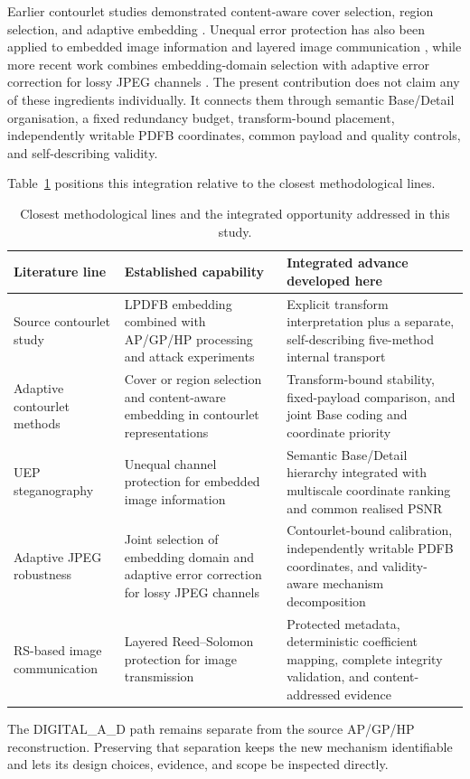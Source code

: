 Earlier contourlet studies demonstrated content-aware cover selection, region selection, and adaptive embedding \citep{SajediJamzad2010,Fakhredanesh2013}. Unequal error protection has also been applied to embedded image information and layered image communication \citep{MaoQin2013,AlmawganiSalleh2011}, while more recent work combines embedding-domain selection with adaptive error correction for lossy JPEG channels \citep{Duan2023}. The present contribution does not claim any of these ingredients individually. It connects them through semantic Base/Detail organisation, a fixed redundancy budget, transform-bound placement, independently writable PDFB coordinates, common payload and quality controls, and self-describing validity.

Table~\ref{tab:novelty} positions this integration relative to the closest methodological lines.

\begin{table}[t]
\centering
\caption{Closest methodological lines and the integrated opportunity addressed in this study.}
\label{tab:novelty}
\small
\begin{tabularx}{\textwidth}{>{\raggedright\arraybackslash}p{}>{\raggedright\arraybackslash}p{}>{\raggedright\arraybackslash}X}
\toprule
Literature line & Established capability & Integrated advance developed here \\
\midrule
Source contourlet study \citep{Kumar2026} & LPDFB embedding combined with AP/GP/HP processing and attack experiments & Explicit transform interpretation plus a separate, self-describing five-method internal transport \\
Adaptive contourlet methods \citep{SajediJamzad2010,Fakhredanesh2013} & Cover or region selection and content-aware embedding in contourlet representations & Transform-bound stability, fixed-payload comparison, and joint Base coding and coordinate priority \\
UEP steganography \citep{MaoQin2013} & Unequal channel protection for embedded image information & Semantic Base/Detail hierarchy integrated with multiscale coordinate ranking and common realised PSNR \\
Adaptive JPEG robustness \citep{Duan2023} & Joint selection of embedding domain and adaptive error correction for lossy JPEG channels & Contourlet-bound calibration, independently writable PDFB coordinates, and validity-aware mechanism decomposition \\
RS-based image communication \citep{AlmawganiSalleh2011} & Layered Reed--Solomon protection for image transmission & Protected metadata, deterministic coefficient mapping, complete integrity validation, and content-addressed evidence \\
\bottomrule
\end{tabularx}
\end{table}

The DIGITAL\_A\_D path remains separate from the source AP/GP/HP reconstruction. Preserving that separation keeps the new mechanism identifiable and lets its design choices, evidence, and scope be inspected directly.
